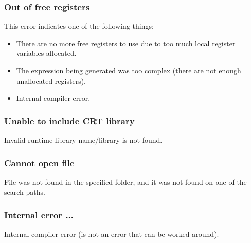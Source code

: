 \subsubsection{Out of free registers}
This error indicates one of the following things:
\begin{itemize}
	\item There are no more free registers to use due to too much local register variables allocated.
	\item The expression being generated was too complex (there are not enough unallocated registers).
	\item Internal compiler error.
\end{itemize}

\subsubsection{Unable to include CRT library}
Invalid runtime library name/library is not found.

\subsubsection{Cannot open file}
File was not found in the specified folder, and it was not found on one of the search paths.

\subsubsection{Internal error ...}
Internal compiler error (is not an error that can be worked around).